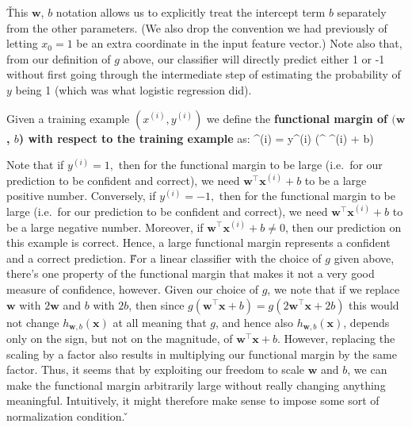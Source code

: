 \v

This $\boldsymbol{w}$, $b$ notation allows us to explicitly treat the intercept term $b$ separately from the other
parameters. (We also drop the convention we had previously of letting $x_0 = 1$ be an extra coordinate in the input
feature vector.) Note also that, from our definition of $g$ above, our classifier will directly predict either 1 or
-1 without first going through the intermediate step of estimating the probability of $y$ being 1 (which was what
logistic regression did).

Given a training example $(x^{(i)}, y^{(i)})$ we define the \textbf{functional margin of $(\boldsymbol{w}$, $b$) with
respect to the training example} as:
\bse
{\hat{\gamma}}^{(i)} = y^{(i)} (^{\intercal} ^{(i)} + b)
\ese
\ed

Note that if $y^{(i)}= 1,$ then for the functional margin to be large (i.e.\ for our prediction to be confident and
correct), we need $\boldsymbol{w}^{\intercal} \boldsymbol{x}^{(i)} + b$ to be a large positive number. Conversely, if
$y^{(i)}= -1,$ then for the functional margin to be large (i.e.\, for our prediction to be confident and correct),
we need $\boldsymbol{w}^{\intercal} \boldsymbol{x}^{(i)} + b$ to be a large negative number. Moreover, if
$\boldsymbol{w}^{\intercal} \boldsymbol{x}^{(i)} + b \neq 0$, then our prediction on this example is correct. Hence,
a large functional margin represents a confident and a correct prediction. \v

For a linear classifier with the choice of $g$ given above, there's one property of the functional margin that makes
it not a very good measure of confidence, however. Given our choice of $g$, we note that if we replace
$\boldsymbol{w}$ with $2\boldsymbol{w}$ and $b$ with $2b$, then since $g \left(\boldsymbol{w}^{\intercal} \boldsymbol{x} +
b\right) = g\left(2\boldsymbol{w}^{\intercal} \boldsymbol{x} + 2b\right)$ this would not change $h_{\boldsymbol{w}, b}
(\boldsymbol{x})$ at all meaning that $g$, and hence also $h_{\boldsymbol{w}, b} (\boldsymbol{x})$, depends only on
the sign, but not on the magnitude, of $\boldsymbol{w}^{\intercal} \boldsymbol{x} + b$. However, replacing the
scaling by a factor also results in multiplying our functional margin by the same factor. Thus, it seems that by
exploiting our freedom to scale $\boldsymbol{w}$ and $b$, we can make the functional margin arbitrarily large without
really changing anything meaningful. Intuitively, it might therefore make sense to impose some sort of normalization
condition. \v

